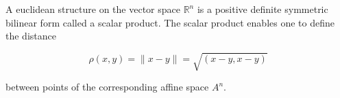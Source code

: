 A euclidean structure on the vector space $\mathbb{R}^n$ is a positive definite symmetric bilinear form called a scalar product. The scalar product enables one to define the distance

$$\rho(x, y) = \|x - y\| = \sqrt{(x - y, x - y)}$$

between points of the corresponding affine space $A^n$.
